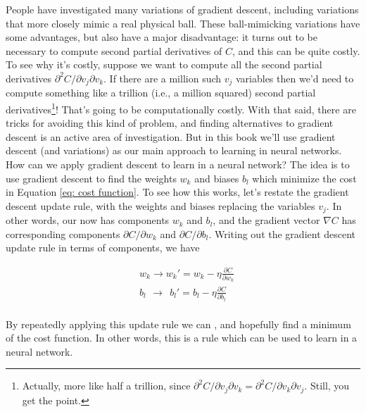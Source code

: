 People have investigated many variations of gradient descent, including variations that more closely mimic a real physical ball. These ball-mimicking variations have some advantages, but also have a major disadvantage: it turns out to be necessary to compute second partial derivatives of $C$, and this can be quite costly. To see why it's costly, suppose we want to compute all the second partial derivatives $\partial^2 C/\partial v_j\partial v_k$. If there are a million such $v_j$ variables then we'd need to compute something like a trillion (i.e., a million squared) second partial derivatives\footnote{Actually, more like half a trillion, since $\partial^2 C/\partial v_j \partial v_k=\partial^2 C/\partial v_k \partial v_j$. Still, you get the point.}! That's going to be computationally costly. With that said, there are tricks for avoiding this kind of problem, and finding alternatives to gradient descent is an active area of investigation. But in this book we'll use gradient descent (and variations) as our main approach to learning in neural networks.\\

How can we apply gradient descent to learn in a neural network? The idea is to use gradient descent to find the weights $w_k$ and biases $b_l$ which minimize the cost in Equation \ref{eq: cost function}. To see how this works, let's restate the gradient descent update rule, with the weights and biases replacing the variables $v_j$. In other words, our  now has components $w_k$ and $b_l$, and the gradient vector $\nabla C$ has corresponding components $\partial C/\partial w_k$ and $\partial C/\partial b_l$. Writing out the gradient descent update rule in terms of components, we have

\begin{equation}
\begin{aligned}
&w_k\rightarrow w_k'=w_k-\eta\frac{\partial C}{\partial w_k}\\
&b_l\ \,\rightarrow\ \  b_l'=b_l-\eta\frac{\partial C}{\partial b_l}\\
\end{aligned}
\label{eq: change of weights and biases}
\end{equation}

By repeatedly applying this update rule we can , and hopefully find a minimum of the cost function. In other words, this is a rule which can be used to learn in a neural network.\\

